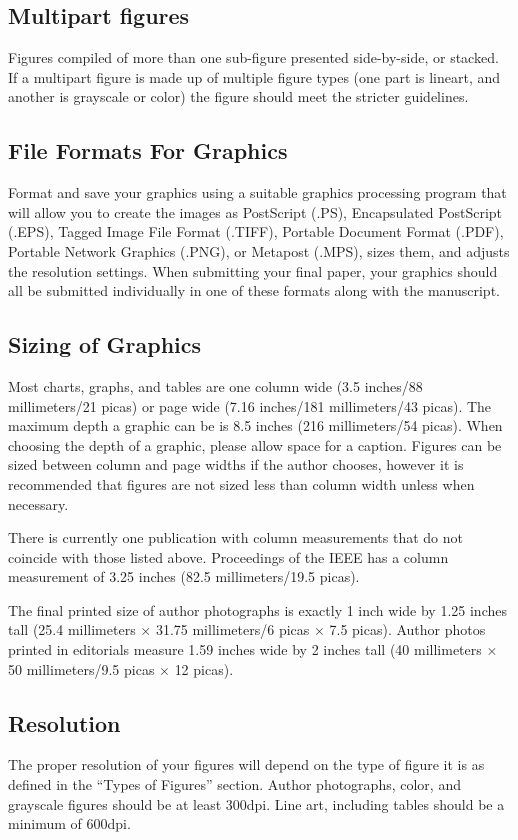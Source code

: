 \documentclass{ieeeaccess}
\begin{document}
\subsection{Multipart figures}
Figures compiled of more than one sub-figure presented side-by-side, or
stacked. If a multipart figure is made up of multiple figure
types (one part is lineart, and another is grayscale or color) the figure
should meet the stricter guidelines.

\subsection{File Formats For Graphics}\label{formats}
Format and save your graphics using a suitable graphics processing program
that will allow you to create the images as PostScript (.PS), Encapsulated
PostScript (.EPS), Tagged Image File Format (.TIFF), Portable Document
Format (.PDF), Portable Network Graphics (.PNG), or Metapost (.MPS), sizes them, and adjusts
the resolution settings. When
submitting your final paper, your graphics should all be submitted
individually in one of these formats along with the manuscript.

\subsection{Sizing of Graphics}
Most charts, graphs, and tables are one column wide (3.5 inches/88
millimeters/21 picas) or page wide (7.16 inches/181 millimeters/43
picas). The maximum depth a graphic can be is 8.5 inches (216 millimeters/54
picas). When choosing the depth of a graphic, please allow space for a
caption. Figures can be sized between column and page widths if the author
chooses, however it is recommended that figures are not sized less than
column width unless when necessary.

There is currently one publication with column measurements that do not
coincide with those listed above. Proceedings of the IEEE has a column
measurement of 3.25 inches (82.5 millimeters/19.5 picas).

The final printed size of author photographs is exactly
1 inch wide by 1.25 inches tall (25.4 millimeters$\,\times\,$31.75 millimeters/6
picas$\,\times\,$7.5 picas). Author photos printed in editorials measure 1.59 inches
wide by 2 inches tall (40 millimeters$\,\times\,$50 millimeters/9.5 picas$\,\times\,$12
picas).

\subsection{Resolution }
The proper resolution of your figures will depend on the type of figure it
is as defined in the ``Types of Figures'' section. Author photographs,
color, and grayscale figures should be at least 300dpi. Line art, including
tables should be a minimum of 600dpi.
\end{document}
